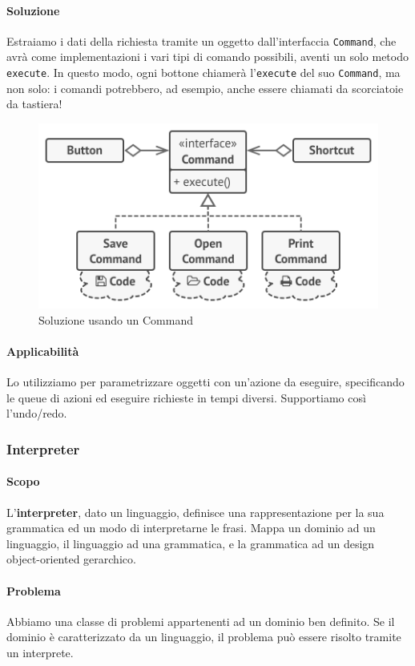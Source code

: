 \documentclass[11pt]{article}
\newcommand{\code}[1]{\texttt{#1}}
\begin{document}
\paragraph{Soluzione}
Estraiamo i dati della richiesta tramite un oggetto dall'interfaccia \code{Command}, che avrà come implementazioni i vari tipi di comando possibili, aventi un solo metodo \code{execute}. In questo modo, ogni bottone chiamerà l'\code{execute} del suo \code{Command}, ma non solo: i comandi potrebbero, ad esempio, anche essere chiamati da scorciatoie da tastiera!
\begin{figure}[H]
    \centering
    \includegraphics[width=0.6\linewidth]{res/teoria/Command.png}
    \caption{Soluzione usando un Command}
\end{figure}
\paragraph{Applicabilità}
Lo utilizziamo per parametrizzare oggetti con un'azione da eseguire, specificando le queue di azioni ed eseguire richieste in tempi diversi. Supportiamo così l'undo/redo.
\subsubsection{Interpreter}
\paragraph{Scopo}
L'\textbf{interpreter}, dato un linguaggio, definisce una rappresentazione per la sua grammatica ed un modo di interpretarne le frasi. Mappa un dominio ad un linguaggio, il linguaggio ad una grammatica, e la grammatica ad un design object-oriented gerarchico.
\paragraph{Problema}
Abbiamo una classe di problemi appartenenti ad un dominio ben definito. Se il dominio è caratterizzato da un linguaggio, il problema può essere risolto tramite un interprete. 
\end{document}
